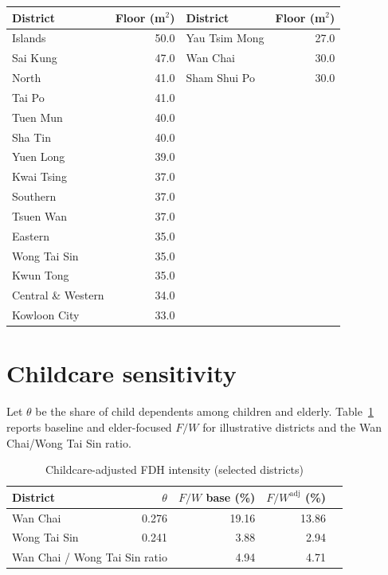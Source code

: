 \documentclass[11pt,a4paper]{article}
\begin{document}
\begin{table}[H]
\centering
\small
\begin{tabular}{@{}lr@{\hspace{2em}}lr@{}}
\toprule
District & Floor (m$^2$) & District & Floor (m$^2$) \\
\midrule
Islands & 50.0 & Yau Tsim Mong & 27.0 \\
Sai Kung & 47.0 & Wan Chai & 30.0 \\
North & 41.0 & Sham Shui Po & 30.0 \\
Tai Po & 41.0 & \\
Tuen Mun & 40.0 & \\
Sha Tin & 40.0 & \\
Yuen Long & 39.0 & \\
Kwai Tsing & 37.0 & \\
Southern & 37.0 & \\
Tsuen Wan & 37.0 & \\
Eastern & 35.0 & \\
Wong Tai Sin & 35.0 & \\
Kwun Tong & 35.0 & \\
Central \& Western & 34.0 & \\
Kowloon City & 33.0 & \\
\bottomrule
\end{tabular}
\end{table}

\section{Childcare sensitivity}
\label{app:childcare}

Let $\theta$ be the share of child dependents among children and elderly. Table~\ref{tab:childcare} reports baseline and elder-focused $F/W$ for illustrative districts and the Wan Chai/Wong Tai Sin ratio.

\begin{table}[H]
\centering
\caption{Childcare-adjusted FDH intensity (selected districts)}
\label{tab:childcare}
\begin{tabular}{@{}lrrrr@{}}
\toprule
District & $\theta$ & $F/W$ base (\%) & $F/W^{\mathrm{adj}}$ (\%) \\
\midrule
Wan Chai & 0.276 & 19.16 & 13.86 \\
Wong Tai Sin & 0.241 & 3.88 & 2.94 \\
\midrule
\multicolumn{2}{l}{Wan Chai / Wong Tai Sin ratio} & 4.94 & 4.71 \\
\bottomrule
\end{tabular}
\end{table}
\end{document}

